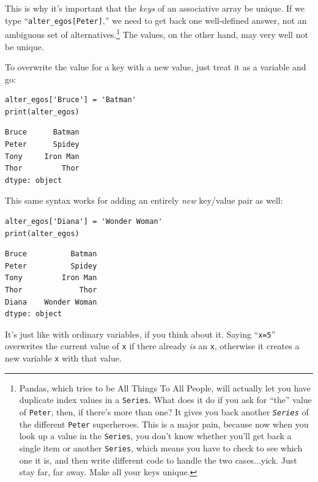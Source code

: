 This is why it's important that the \textit{keys} of an associative array be
unique. If we type
``\texttt{alter\_egos[\textquotesingle Peter\textquotesingle]},'' we need to
get back one well-defined answer, not an ambiguous set of
alternatives.\footnote{Pandas, which tries to be All Things To All
People\texttrademark, will actually let you have duplicate index values in a
\texttt{Series}. What does it do if you ask for ``the'' value of
\texttt{Peter}, then, if there's more than one? It gives you back another
\textit{\texttt{Series}} of the different \texttt{Peter} superheroes. This is a
major pain, because now when you look up a value in the \texttt{Series}, you
don't know whether you'll get back a single item or another \texttt{Series},
which means you have to check to see which one it is, and then write different
code to handle the two cases...yick. Just stay far, far away. Make all your
keys unique.} The values, on the other hand, may very well not be unique.

\smallskip
To overwrite the value for a key with a new value, just treat it as a variable
and go:

\begin{Verbatim}[fontsize=\small,samepage=true,frame=single,framesep=3mm]
alter_egos['Bruce'] = 'Batman'
print(alter_egos)
\end{Verbatim}

\begin{Verbatim}[fontsize=\small,samepage=true,frame=leftline,framesep=5mm,framerule=1mm]
Bruce      Batman
Peter      Spidey
Tony     Iron Man
Thor         Thor
dtype: object
\end{Verbatim}

This same syntax works for adding an entirely \textit{new} key/value pair as
well:

\begin{Verbatim}[fontsize=\small,samepage=true,frame=single,framesep=3mm]
alter_egos['Diana'] = 'Wonder Woman'
print(alter_egos)
\end{Verbatim}

\begin{Verbatim}[fontsize=\small,samepage=true,frame=leftline,framesep=5mm,framerule=1mm]
Bruce          Batman
Peter          Spidey
Tony         Iron Man
Thor             Thor
Diana    Wonder Woman
dtype: object
\end{Verbatim}

It's just like with ordinary variables, if you think about it. Saying
``\texttt{x=5}'' overwrites the current value of \texttt{x} if there already
\textit{is} an \texttt{x}, otherwise it creates a new variable \texttt{x} with
that value.

